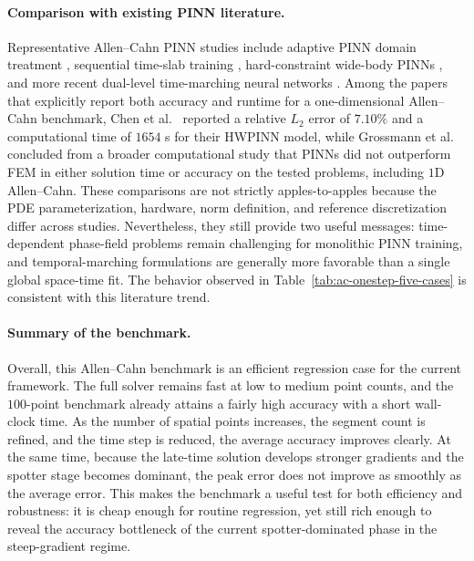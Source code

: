 \paragraph{Comparison with existing PINN literature.}
Representative Allen--Cahn PINN studies include adaptive PINN domain treatment \cite{wight2021adaptive}, sequential time-slab training \cite{mattey2022sequential}, hard-constraint wide-body PINNs \cite{chen2024hwpinn}, and more recent dual-level time-marching neural networks \cite{guo2025dualtime}. Among the papers that explicitly report both accuracy and runtime for a one-dimensional Allen--Cahn benchmark, Chen et al.~\cite{chen2024hwpinn} reported a relative $L_2$ error of $7.10\%$ and a computational time of $1654$ s for their HWPINN model, while Grossmann et al.~\cite{grossmann2024fem} concluded from a broader computational study that PINNs did not outperform FEM in either solution time or accuracy on the tested problems, including $1$D Allen--Cahn. These comparisons are not strictly apples-to-apples because the PDE parameterization, hardware, norm definition, and reference discretization differ across studies. Nevertheless, they still provide two useful messages: time-dependent phase-field problems remain challenging for monolithic PINN training, and temporal-marching formulations are generally more favorable than a single global space-time fit. The behavior observed in Table~\ref{tab:ac-onestep-five-cases} is consistent with this literature trend.

\paragraph{Summary of the benchmark.}
Overall, this Allen--Cahn benchmark is an efficient regression case for the current framework. The full solver remains fast at low to medium point counts, and the $100$-point benchmark already attains a fairly high accuracy with a short wall-clock time. As the number of spatial points increases, the segment count is refined, and the time step is reduced, the average accuracy improves clearly. At the same time, because the late-time solution develops stronger gradients and the spotter stage becomes dominant, the peak error does not improve as smoothly as the average error. This makes the benchmark a useful test for both efficiency and robustness: it is cheap enough for routine regression, yet still rich enough to reveal the accuracy bottleneck of the current spotter-dominated phase in the steep-gradient regime.

